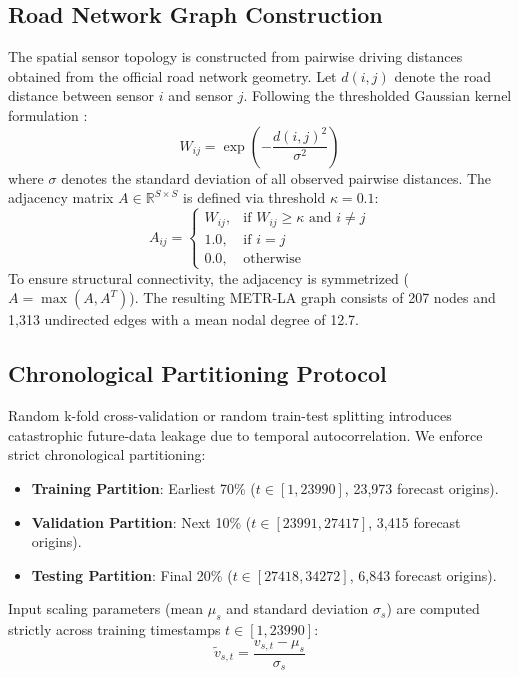 \documentclass[conference]{IEEEtran}
\begin{document}
\subsection{Road Network Graph Construction}
The spatial sensor topology is constructed from pairwise driving distances obtained from the official road network geometry. Let $d(i, j)$ denote the road distance between sensor $i$ and sensor $j$. Following the thresholded Gaussian kernel formulation \cite{li2018dcrnn}:
\begin{equation}
W_{ij} = \exp\left( - \frac{d(i, j)^2}{\sigma^2} \right)
\end{equation}
where $\sigma$ denotes the standard deviation of all observed pairwise distances. The adjacency matrix $A \in \mathbb{R}^{S \times S}$ is defined via threshold $\kappa = 0.1$:
\begin{equation}
A_{ij} = \begin{cases} 
W_{ij}, & \text{if } W_{ij} \ge \kappa \text{ and } i \ne j \\ 
1.0, & \text{if } i = j \\ 
0.0, & \text{otherwise} 
\end{cases}
\end{equation}
To ensure structural connectivity, the adjacency is symmetrized ($A = \max(A, A^T)$). The resulting METR-LA graph consists of 207 nodes and 1,313 undirected edges with a mean nodal degree of 12.7.

\subsection{Chronological Partitioning Protocol}
Random k-fold cross-validation or random train-test splitting introduces catastrophic future-data leakage due to temporal autocorrelation. We enforce strict chronological partitioning:
\begin{itemize}
    \item \textbf{Training Partition}: Earliest 70\% ($t \in [1, 23990]$, 23,973 forecast origins).
    \item \textbf{Validation Partition}: Next 10\% ($t \in [23991, 27417]$, 3,415 forecast origins).
    \item \textbf{Testing Partition}: Final 20\% ($t \in [27418, 34272]$, 6,843 forecast origins).
\end{itemize}
Input scaling parameters (mean $\mu_s$ and standard deviation $\sigma_s$) are computed strictly across training timestamps $t \in [1, 23990]$:
\begin{equation}
\tilde{v}_{s,t} = \frac{v_{s,t} - \mu_s}{\sigma_s}
\end{equation}
\end{document}
